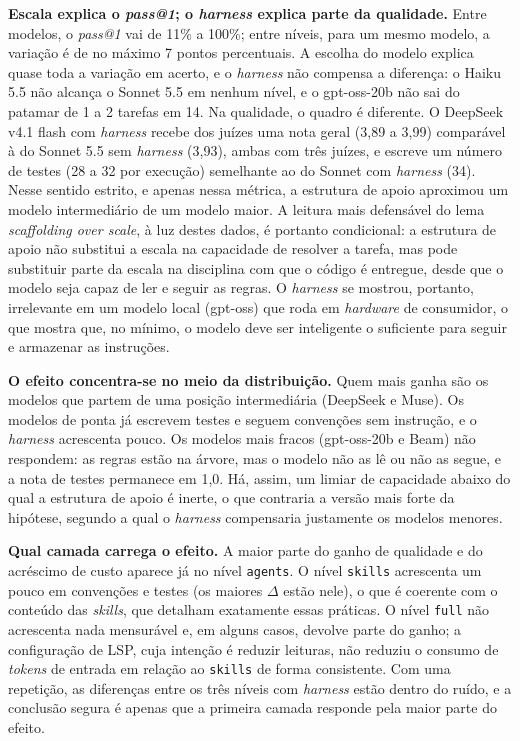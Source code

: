 \textbf{Escala explica o \textit{pass@1}; o \textit{harness} explica parte da
qualidade.} Entre modelos, o \textit{pass@1} vai de 11\% a 100\%; entre níveis,
para um mesmo modelo, a variação é de no máximo 7 pontos percentuais. A escolha
do modelo explica quase toda a variação em acerto, e o \textit{harness} não
compensa a diferença: o Haiku 5.5 não alcança o Sonnet 5.5 em nenhum nível, e o
gpt-oss-20b não sai do patamar de 1 a 2 tarefas em 14. Na qualidade, o quadro é
diferente. O DeepSeek v4.1 flash com \textit{harness} recebe dos juízes uma nota
geral (3,89 a 3,99) comparável à do Sonnet 5.5 sem \textit{harness} (3,93),
ambas com três juízes, e
escreve um número de testes (28 a 32 por execução) semelhante ao do Sonnet
com \textit{harness} (34). Nesse sentido estrito, e apenas nessa métrica, a
estrutura de apoio aproximou um modelo intermediário de um modelo maior. A
leitura mais defensável do lema \textit{scaffolding over scale}, à luz destes
dados, é portanto condicional: a estrutura de apoio não substitui a escala na
capacidade de resolver a tarefa, mas pode substituir parte da escala na
disciplina com que o código é entregue, desde que o modelo seja capaz de ler
e seguir as regras. O \textit{harness} se mostrou, portanto, irrelevante em um modelo local (gpt-oss) que roda em \textit{hardware} de consumidor, o que mostra que, no mínimo, o modelo deve ser inteligente o suficiente para seguir e armazenar as instruções.

\textbf{O efeito concentra-se no meio da distribuição.} Quem mais ganha são
os modelos que partem de uma posição intermediária (DeepSeek e Muse). Os
modelos de ponta já escrevem testes e seguem convenções sem instrução, e o
\textit{harness} acrescenta pouco. Os modelos mais fracos (gpt-oss-20b e Beam)
não respondem: as regras estão na árvore, mas o modelo não as lê ou não as
segue, e a nota de testes permanece em 1,0. Há, assim, um limiar de capacidade
abaixo do qual a estrutura de apoio é inerte, o que contraria a versão mais
forte da hipótese, segundo a qual o \textit{harness} compensaria justamente os
modelos menores.

\textbf{Qual camada carrega o efeito.} A maior parte do ganho de qualidade e
do acréscimo de custo aparece já no nível \texttt{agents}. O nível
\texttt{skills} acrescenta um pouco em convenções e testes (os maiores $\Delta$
estão nele), o que é coerente com o conteúdo das \textit{skills}, que detalham
exatamente essas práticas. O nível \texttt{full} não acrescenta nada mensurável
e, em alguns casos, devolve parte do ganho; a configuração de LSP, cuja intenção
é reduzir leituras, não reduziu o consumo de \textit{tokens} de entrada em
relação ao \texttt{skills} de forma consistente. Com uma repetição, as
diferenças entre os três níveis com \textit{harness} estão dentro do ruído, e a
conclusão segura é apenas que a primeira camada responde pela maior parte do
efeito.


